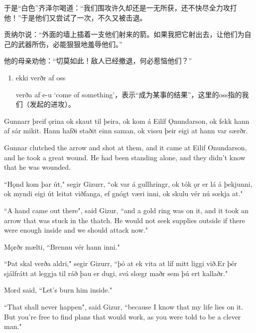 \begin{translation*}{}
  于是“白色”齐泽尔喝道：“我们围攻许久却还是一无所获，还不快尽全力攻打他！”于是他们又尝试了一次，不久又被击退。

  贡纳尔说：“外面的墙上插着一支他们射来的箭。如果我把它射出去，让他们为自己的武器所伤，必能狠狠地羞辱他们。”

  他的母亲劝他：“切莫如此！敌人已经撤退，何必惹恼他们？”
\end{translation*}
\begin{grammar*}{}
  \begin{enumerate}[leftmargin=*]
    \item ekki verðr af oss

          verða af e-u `come of something'，表示“成为某事的结果”，这里的oss指的我们（发起的进攻）。
  \end{enumerate}
\end{grammar*}
\begin{paracol}{2}
  Gunnarr þreif ǫrina ok skaut til þeira, ok kom á Eilíf Ǫnundarson, ok fekk hann af sár mikit. Hann hafði staðit einn saman, ok vissu þeir eigi at hann var særðr.

  \switchcolumn
  Gunnar clutched the arrow and shot at them, and it came at Eilif Onundarson, and he took a great wound. He had been standing alone, and they didn't know that he was wounded.

  \switchcolumn*

  ``Hǫnd kom þar út," segir Gizurr, ``ok var á gullhringr, ok tók ǫr er lá á þekjunni, ok myndi eigi út leitat viðfanga, ef gnógt væri inni, ok skulu vér nú sœkja at."

  \switchcolumn

  ``A hand came out there", said Gizur, ``and a gold ring was on it, and it took an arrow that was stuck in the thatch. He would not seek supplies outside if there were enough inside and we should attack now."

  \switchcolumn*

  Mǫrðr mælti, ``Brennu vér hann inni."

  ``Þat skal verða aldri," segir Gizurr, ``þó at ek vita at líf mitt liggi við.\footnotemark Er þér sjálfrátt at leggja til ráð þau er dugi, svá slœgr maðr sem þú ert kallaðr."

  \switchcolumn

  Mord said, ``Let's burn him inside."

  ``That shall never happen", said Gizur, ``because I know that my life lies on it. But you're free to find plans that would work, as you were told to be a clever man."
\end{paracol}


